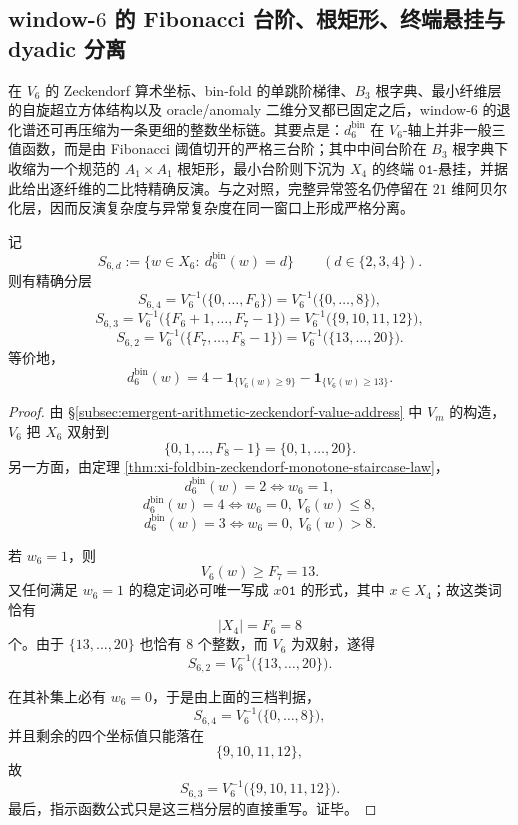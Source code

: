 \subsection{window-\texorpdfstring{$6$}{6} 的 Fibonacci 台阶、根矩形、终端悬挂与 dyadic 分离}\label{subsec:conclusion-window6-fibonacci-staircase-root-rectangle-dyadic-separation}
在 \(V_6\) 的 Zeckendorf 算术坐标、bin-fold 的单跳阶梯律、\(B_3\) 根字典、最小纤维层的自旋超立方体结构以及 oracle/anomaly 二维分叉都已固定之后，window-\(6\) 的退化谱还可再压缩为一条更细的整数坐标链。其要点是：\(d_6^{\mathrm{bin}}\) 在 \(V_6\)-轴上并非一般三值函数，而是由 Fibonacci 阈值切开的严格三台阶；其中中间台阶在 \(B_3\) 根字典下收缩为一个规范的 \(A_1\times A_1\) 根矩形，最小台阶则下沉为 \(X_4\) 的终端 \(\mathtt{01}\)-悬挂，并据此给出逐纤维的二比特精确反演。与之对照，完整异常签名仍停留在 \(21\) 维阿贝尔化层，因而反演复杂度与异常复杂度在同一窗口上形成严格分离。

\begin{theorem}\label{thm:conclusion-window6-fibonacci-staircase}
记
\[
S_{6,d}:=\{w\in X_6:\ d_6^{\mathrm{bin}}(w)=d\}
\qquad (d\in\{2,3,4\}).
\]
则有精确分层
\[
S_{6,4}
=
V_6^{-1}\!\bigl(\{0,\dots,F_6\}\bigr)
=
V_6^{-1}\!\bigl(\{0,\dots,8\}\bigr),
\]
\[
S_{6,3}
=
V_6^{-1}\!\bigl(\{F_6+1,\dots,F_7-1\}\bigr)
=
V_6^{-1}\!\bigl(\{9,10,11,12\}\bigr),
\]
\[
S_{6,2}
=
V_6^{-1}\!\bigl(\{F_7,\dots,F_8-1\}\bigr)
=
V_6^{-1}\!\bigl(\{13,\dots,20\}\bigr).
\]
等价地，
\[
d_6^{\mathrm{bin}}(w)
=
4-\mathbf 1_{\{V_6(w)\ge 9\}}-\mathbf 1_{\{V_6(w)\ge 13\}}.
\]
\end{theorem}
\begin{proof}
由 \S\ref{subsec:emergent-arithmetic-zeckendorf-value-address} 中 \(V_m\) 的构造，\(V_6\) 把 \(X_6\) 双射到
\[
\{0,1,\dots,F_8-1\}=\{0,1,\dots,20\}.
\]
另一方面，由定理 \ref{thm:xi-foldbin-zeckendorf-monotone-staircase-law}，
\[
d_6^{\mathrm{bin}}(w)=2
\iff
w_6=1,
\]
\[
d_6^{\mathrm{bin}}(w)=4
\iff
w_6=0,\ V_6(w)\le 8,
\]
\[
d_6^{\mathrm{bin}}(w)=3
\iff
w_6=0,\ V_6(w)>8.
\]

若 \(w_6=1\)，则
\[
V_6(w)\ge F_7=13.
\]
又任何满足 \(w_6=1\) 的稳定词必可唯一写成 \(x\mathtt{01}\) 的形式，其中 \(x\in X_4\)；故这类词恰有
\[
|X_4|=F_6=8
\]
个。由于 \(\{13,\dots,20\}\) 也恰有 \(8\) 个整数，而 \(V_6\) 为双射，遂得
\[
S_{6,2}=V_6^{-1}\!\bigl(\{13,\dots,20\}\bigr).
\]

在其补集上必有 \(w_6=0\)，于是由上面的三档判据，
\[
S_{6,4}=V_6^{-1}\!\bigl(\{0,\dots,8\}\bigr),
\]
并且剩余的四个坐标值只能落在
\[
\{9,10,11,12\},
\]
故
\[
S_{6,3}=V_6^{-1}\!\bigl(\{9,10,11,12\}\bigr).
\]
最后，指示函数公式只是这三档分层的直接重写。证毕。
\end{proof}

